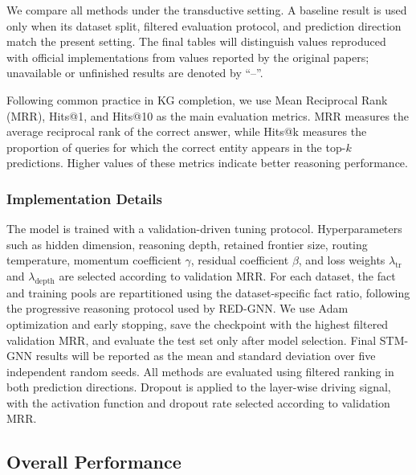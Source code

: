 \documentclass[a4paper,fleqn]{cas-sc}
\begin{document}
We compare all methods under the transductive setting. A baseline result is used
only when its dataset split, filtered evaluation protocol, and prediction
direction match the present setting. The final tables will distinguish values
reproduced with official implementations from values reported by the original
papers; unavailable or unfinished results are denoted by ``--''.

Following common practice in KG completion, we use Mean Reciprocal Rank (MRR),
Hits@1, and Hits@10 as the main evaluation metrics. MRR measures the average
reciprocal rank of the correct answer, while Hits@k measures the proportion of
queries for which the correct entity appears in the top-$k$ predictions. Higher
values of these metrics indicate better reasoning performance.

\subsubsection{Implementation Details}\label{subsec:implementation}

The model is trained with a validation-driven tuning protocol. Hyperparameters
such as hidden dimension, reasoning depth, retained frontier size, routing
temperature, momentum coefficient $\gamma$, residual coefficient $\beta$, and
loss weights $\lambda_{\mathrm{tr}}$ and $\lambda_{\mathrm{depth}}$ are selected
according to validation MRR. For each dataset, the fact and training pools are
repartitioned using the dataset-specific fact ratio, following the progressive
reasoning protocol used by RED-GNN. We use Adam optimization and early stopping,
save the checkpoint with the highest filtered validation MRR, and evaluate the
test set only after model selection. Final STM-GNN results will be reported as
the mean and standard deviation over five independent random seeds. All methods
are evaluated using filtered ranking in both prediction directions. Dropout is
applied to the layer-wise driving signal, with the activation function and
dropout rate selected according to validation MRR.

\subsection{Overall Performance}\label{subsec:main_results}
\end{document}
